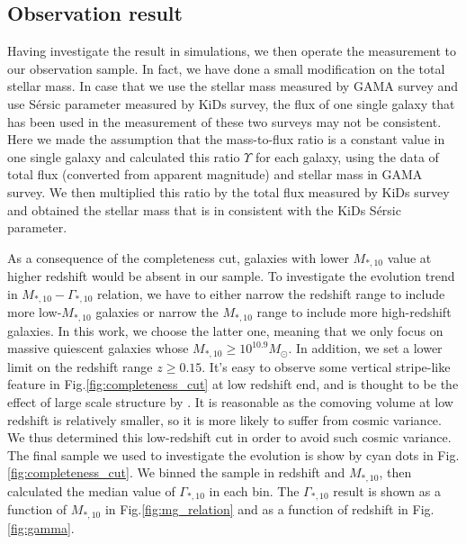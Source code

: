 \documentclass[fleqn,usenatbib]{mnras}
\begin{document}
\subsection{Observation result}
\label{sec:obres}
\par Having investigate the result in simulations, we then operate the measurement to our observation sample. In fact, we have done a small modification on the total stellar mass. In case that we use the stellar mass measured by GAMA survey and use S\'{e}rsic parameter measured by KiDs survey, the flux of one single galaxy that has been used in the measurement of these two surveys may not be consistent. Here we made the assumption that the mass-to-flux ratio is a constant value in one single galaxy and calculated this ratio $\Upsilon$ for each galaxy, using the data of total flux (converted from apparent magnitude) and stellar mass in GAMA survey. We then multiplied this ratio by the total flux measured by KiDs survey and obtained the stellar mass that is in consistent with the KiDs S\'{e}rsic parameter.  
\par As a consequence of the completeness cut, galaxies with lower $M_{*,10}$ value at higher redshift would be absent in our sample. To investigate the evolution trend in $M_{*,10 } - \Gamma_{*,10}$ relation, we have to either narrow the redshift range to include more low-$M_{*,10}$ galaxies or narrow the $M_{*,10}$ range to include more high-redshift galaxies. In this work, we choose the latter one, meaning that we only focus on massive quiescent galaxies whose $M_{*,10} \geq 10^{10.9} M_{\odot}$. In addition, we set a lower limit on the redshift range $ z \geq 0.15$. It's easy to observe some vertical stripe-like feature in Fig.\ref{fig:completeness_cut} at low redshift end, and is thought to be the effect of large scale structure by \cite{GAMAmain}. It is reasonable as the comoving volume at low redshift is relatively smaller, so it is more likely to suffer from cosmic variance. We thus determined this low-redshift cut in order to avoid such cosmic variance. The final sample we used to investigate the evolution is show by cyan dots in Fig.\ref{fig:completeness_cut}. We binned the sample in redshift and $M_{*,10}$, then calculated the median value of $\Gamma_{*,10}$ in each bin. The $\Gamma_{*,10}$ result is shown as a function of $M_{*,10}$ in Fig.\ref{fig:mg_relation} and as a function of redshift in Fig.\ref{fig:gamma}.
\end{document}

